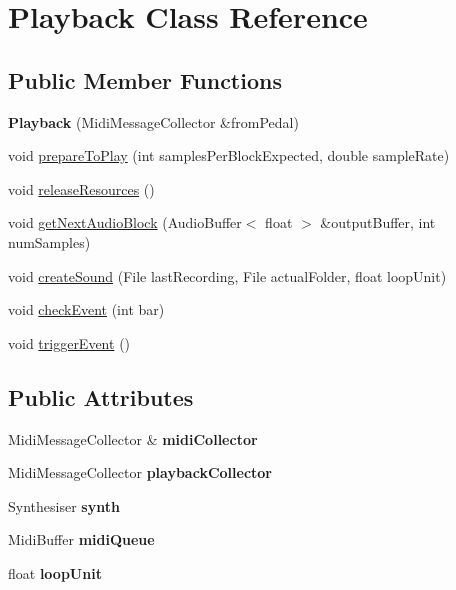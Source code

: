 \hypertarget{class_playback}{}\section{Playback Class Reference}
\label{class_playback}
\subsection*{Public Member Functions}
\begin{DoxyCompactItemize}
\item 
\mbox{\label{class_playback_a3e0894ba2543a097353183a56ff963b7}} 
{\bfseries Playback} (Midi\+Message\+Collector \&from\+Pedal)
\item 
void \mbox{\hyperlink{class_playback_a9ab23908a3f6a1c91636f5d107cfbda0}{prepare\+To\+Play}} (int samples\+Per\+Block\+Expected, double sample\+Rate)
\item 
void \mbox{\hyperlink{class_playback_a9267b09168b637dbe4964fe2c2d70faf}{release\+Resources}} ()
\item 
void \mbox{\hyperlink{class_playback_ad733ca6b60c689fbb7b32e8f9542d46d}{get\+Next\+Audio\+Block}} (Audio\+Buffer$<$ float $>$ \&output\+Buffer, int num\+Samples)
\item 
void \mbox{\hyperlink{class_playback_a7a9305b20478e6341b5e642a9430106a}{create\+Sound}} (File last\+Recording, File actual\+Folder, float loop\+Unit)
\item 
void \mbox{\hyperlink{class_playback_af7732d93fe617e0b1d2c82b1f7c949f3}{check\+Event}} (int bar)
\item 
void \mbox{\hyperlink{class_playback_a760402c6c68ba6fe5b154ec0d19c3b25}{trigger\+Event}} ()
\end{DoxyCompactItemize}
\subsection*{Public Attributes}
\begin{DoxyCompactItemize}
\item 
\mbox{\label{class_playback_a2f261fc2a3752a8a2e2f4cde8d635294}} 
Midi\+Message\+Collector \& {\bfseries midi\+Collector}
\item 
\mbox{\label{class_playback_a4921589c33b80b9a3f97b266eaedd5f8}} 
Midi\+Message\+Collector {\bfseries playback\+Collector}
\item 
\mbox{\label{class_playback_af74d89db1bd204f70fe59067d30be40a}} 
Synthesiser {\bfseries synth}
\item 
\mbox{\label{class_playback_aec0480c699078359b10d7d565565e94e}} 
Midi\+Buffer {\bfseries midi\+Queue}
\item 
\mbox{\label{class_playback_ab3113bd40829c765a653a48912b7151b}} 
float {\bfseries loop\+Unit}
\end{DoxyCompactItemize}



